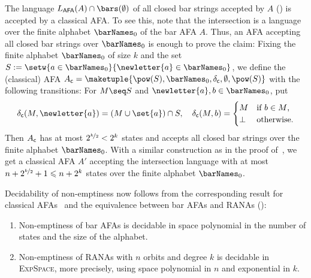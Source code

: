 \documentclass[10pt, final, conference, a4paper, twocolumn]{IEEEtran}
\newcommand{\EXPSPACE}{\textsc{ExpSpace}\xspace}
\begin{document}
\begin{rem}\label{rem:fixAFA}
  The language $L_{\textsf{\scriptsize AFA}}(A) \cap \bars(\emptyset)$ of all closed bar
  strings accepted by $A$ () is accepted by a classical AFA. To see
  this, note that the intersection is a language over the finite alphabet $\barNames_0$ of the
  bar AFA $A$. Thus, an AFA accepting all closed bar strings over $\barNames_0$ is enough to
  prove the claim: Fixing the finite alphabet $\barNames_0$ of size $k$ and the set
  $S := \setw{a \in \barNames_0}{\newletter{a} \in \barNames_0}$, we define the (classical) AFA
  $A_{\textsf{\scriptsize c}} = \maketuple{\pow(S), \barNames_0, \delta_{\textsf{\scriptsize
        c}}, \emptyset, \pow(S)}$ with the following transitions: For $M \seq S$ and
  $\newletter{a}, b \in \barNames_0$, put
  \[
    \delta_{\textsf{\scriptsize c}}(M, \newletter{a}) = (M \cup \set{a}) \cap S, \quad
    \delta_{\textsf{\scriptsize c}}(M, b)
    =
    \begin{cases}
      M & \text{if $b \in M$,} \\
      \bot & \text{otherwise.}
    \end{cases}
  \]
  Then  
  $A_{\textsf{\scriptsize c}}$ has at most $2^{\nicefrac{k}{2}} < 2^k$ states and accepts all closed bar strings over the finite alphabet $\barNames_0$. 
  With a similar construction as in the proof of~, we get a classical AFA $A'$ accepting
  the intersection language with at most $n + 2^{\nicefrac{k}{2}} + 1 \leqslant n + 2^k$ states over the finite
  alphabet $\barNames_0$.
\end{rem}

Decidability of non-emptiness now follows from the corresponding result for classical AFAs~\cite[Thm.~3.1]{jr91}
and the equivalence between bar AFAs and RANAs ():

\begin{theo}
  \label{thm:decneRANA}
  \begin{enumerate}%
    \item Non-emptiness of bar AFAs is decidable
      in space polynomial in the number of states and the size of the alphabet.
    \item Non-emptiness of RANAs with $n$ orbits and degree $k$ 
      is decidable in \EXPSPACE, more precisely, using space polynomial in $n$
      and exponential in $k$.
  \end{enumerate}
\end{theo}
\end{document}
